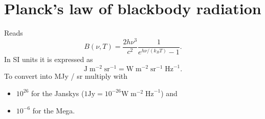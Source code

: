 \documentclass[a4paper,onecolumn,12pt]{revtex4-1}
\begin{document}
\section{Planck's law of blackbody radiation}

Reads
\begin{equation}
  B(\nu, T)
    = \frac{2 h \nu^3}{c^2} \frac{1}{e^{h \nu / (k_B T)} - 1}.
\end{equation}
In SI units it is expressed as
\begin{equation}
  \text{J} \;\text{m}^{-2} \;\text{sr}^{-1}
    = \text{W} \; \text{m}^{-2} \; \text{sr}^{-1} \; \text{Hz}^{-1}.
\end{equation}
To convert into MJy / sr multiply with
\begin{itemize}
  \item \(10^{26}\) for the Janskys (\(1 \text{Jy} = 10^{-26} \text{W} \; \text{m}^{-2} \;\text{Hz}^{-1}\)) and
  \item \(10^{-6}\) for the Mega.
\end{itemize}
\end{document}
